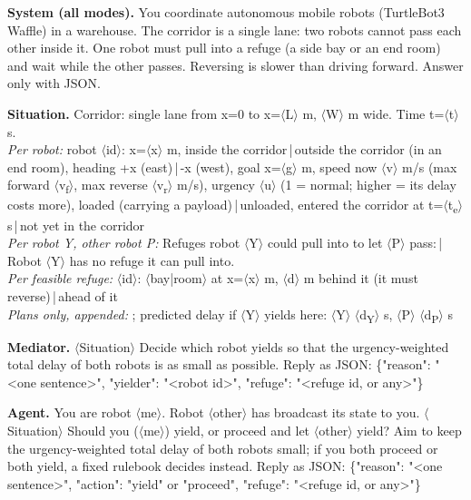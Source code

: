 \documentclass[journal]{IEEEtran}
\begin{document}
{\footnotesize\raggedright\ttfamily
\textbf{System (all modes).} You coordinate autonomous mobile robots (TurtleBot3 Waffle) in a warehouse. The corridor is a single lane: two robots cannot pass each other inside it. One robot must pull into a refuge (a side bay or an end room) and wait while the other passes. Reversing is slower than driving forward. Answer only with JSON.

\textbf{Situation.} Corridor: single lane from x=0 to x=$\langle$L$\rangle$ m, $\langle$W$\rangle$ m wide. Time t=$\langle$t$\rangle$ s.\\
\textit{Per robot:} robot $\langle$id$\rangle$: x=$\langle$x$\rangle$ m, inside the corridor\,|\,outside the corridor (in an end room), heading +x (east)\,|\,-x (west), goal x=$\langle$g$\rangle$ m, speed now $\langle$v$\rangle$ m/s (max forward $\langle$v\textsubscript{f}$\rangle$, max reverse $\langle$v\textsubscript{r}$\rangle$ m/s), urgency $\langle$u$\rangle$ (1 = normal; higher = its delay costs more), loaded (carrying a payload)\,|\,unloaded, entered the corridor at t=$\langle$t\textsubscript{e}$\rangle$ s\,|\,not yet in the corridor\\
\textit{Per robot Y, other robot P:} Refuges robot $\langle$Y$\rangle$ could pull into to let $\langle$P$\rangle$ pass:\,|\,Robot $\langle$Y$\rangle$ has no refuge it can pull into.\\
\textit{Per feasible refuge:} $\langle$id$\rangle$: $\langle$bay|room$\rangle$ at x=$\langle$x$\rangle$ m, $\langle$d$\rangle$ m behind it (it must reverse)\,|\,ahead of it\\
\textit{Plans only, appended:} ; predicted delay if $\langle$Y$\rangle$ yields here: $\langle$Y$\rangle$ $\langle$d\textsubscript{Y}$\rangle$ s, $\langle$P$\rangle$ $\langle$d\textsubscript{P}$\rangle$ s

\textbf{Mediator.} $\langle$Situation$\rangle$ Decide which robot yields so that the urgency-weighted total delay of both robots is as small as possible. Reply as JSON: \{"reason": "<one sentence>", "yielder": "<robot id>", "refuge": "<refuge id, or any>"\}

\textbf{Agent.} You are robot $\langle$me$\rangle$. Robot $\langle$other$\rangle$ has broadcast its state to you. $\langle$Situation$\rangle$ Should you ($\langle$me$\rangle$) yield, or proceed and let $\langle$other$\rangle$ yield? Aim to keep the urgency-weighted total delay of both robots small; if you both proceed or both yield, a fixed rulebook decides instead. Reply as JSON: \{"reason": "<one sentence>", "action": "yield" or "proceed", "refuge": "<refuge id, or any>"\}

}
\end{document}
